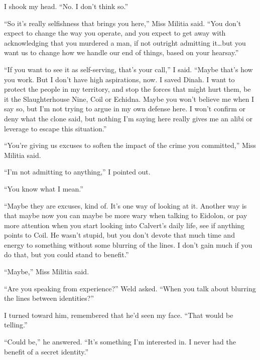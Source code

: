 I shook my head.  ``No.  I don't think so.''



``So it's really selfishness that brings you here,'' Miss Militia said.  ``You don't expect to change the way you operate, and you expect to get away with acknowledging that you murdered a man, if not outright admitting it\ldots but you want us to change how we handle our end of things, based on your hearsay.''



``If you want to see it as self-serving, that's your call,'' I said.  ``Maybe that's how you work.  But I don't have high aspirations, now.  I saved Dinah.  I want to protect the people in my territory, and stop the forces that might hurt them, be it the Slaughterhouse Nine, Coil or Echidna.  Maybe you won't believe me when I say so, but I'm not trying to argue in my own defense here.  I won't confirm or deny what the clone said, but nothing I'm saying here really gives me an alibi or leverage to escape this situation.''



``You're giving us excuses to soften the impact of the crime you committed,'' Miss Militia said.



``I'm not admitting to anything,'' I pointed out.



``You know what I mean.''



``Maybe they are excuses, kind of.  It's one way of looking at it.  Another way is that maybe now you can maybe be more wary when talking to Eidolon, or pay more attention when you start looking into Calvert's daily life, see if anything points to Coil.  He wasn't stupid, but you don't devote that much time and energy to something without some blurring of the lines.  I don't gain much if you do that, but you could stand to benefit.''



``Maybe,'' Miss Militia said.



``Are you speaking from experience?'' Weld asked.  ``When you talk about blurring the lines between identities?''



I turned toward him, remembered that he'd seen my face.  ``That would be telling.''



``Could be,'' he answered.  ``It's something I'm interested in.  I never had the benefit of a secret identity.''



